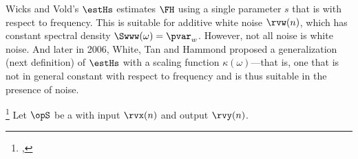 Wicks and Vold's $\estHs$ estimates $\FH$ using a single parameter $s$
that is  with respect to frequency.
This is suitable for additive white noise $\rvw(n)$, which has constant spectral density
$\Swww(\omega)=\pvar_w$.
However, not all noise is white noise.
And later in 2006, White, Tan and Hammond proposed a generalization (next definition) of $\estHs$ with a scaling
function $\kappa(\omega)$---that is, one that is not in general constant with respect to frequency
and is thus suitable in the presence of  noise.
\begin{definition}                                                                   %
\footnote{                                                                           %
  ,                                                     %
  }                                                                                  %
\label{def:Hkp}                                                                      %
Let $\opS$ be a  with input $\rvx(n)$ and output $\rvy(n)$.
\end{definition}


